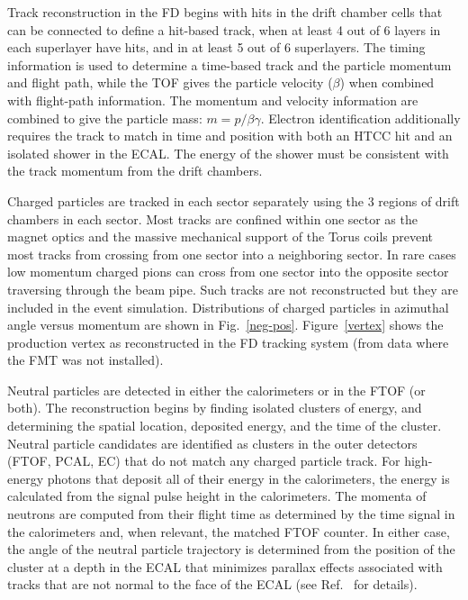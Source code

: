 \documentclass[final,3p,twocolumn]{elsarticle}
\begin{document}
Track reconstruction in the FD begins with hits in the drift chamber cells that can be connected to define a 
hit-based track, when at least 4 out of 6 layers in each superlayer have hits, and in at least 5 out of 6 superlayers. The
timing information is used to determine a time-based track and the particle momentum and flight path, while the TOF
gives the particle velocity ($\beta$) when combined with flight-path information. The momentum and velocity information
are combined to give the particle mass: $m = p/\beta\gamma$. Electron identification additionally requires the track to
match in time and position with both an HTCC hit and an isolated shower in the ECAL. The energy of the shower must be
consistent with the track momentum from the drift chambers.  

Charged particles are tracked in each sector separately using the 3 regions of drift chambers in each sector. Most
tracks are confined within one sector as the magnet optics and the massive mechanical support of the Torus coils
prevent most tracks from crossing from one sector into a neighboring sector. In rare cases low momentum charged
pions can cross from one sector into the opposite sector traversing through the beam pipe. Such tracks are not
reconstructed but they are included in the event simulation. Distributions of charged particles in azimuthal angle
versus momentum are shown in Fig.~\ref{neg-pos}. Figure~\ref{vertex} shows the production vertex as reconstructed
in the FD tracking system (from data where the FMT was not installed). 

Neutral particles are detected in either the calorimeters or in the FTOF (or both). The reconstruction begins by finding
isolated clusters of energy, and determining the spatial location, deposited energy, and the time of the cluster. Neutral
particle candidates are identified as clusters in the outer detectors (FTOF, PCAL, EC) that do not match any charged
particle track. For high-energy photons that deposit all of their energy in the calorimeters, the energy is calculated from
the signal pulse height in the calorimeters. The momenta of neutrons are computed from their flight time as determined
by the time signal in the calorimeters and, when relevant, the matched FTOF counter. In either case, the angle of the
neutral particle trajectory is determined from the position of the cluster at a depth in the ECAL that minimizes
parallax effects associated with tracks that are not normal to the face of the ECAL (see Ref.~\cite{ECAL} for
details).
\end{document}
